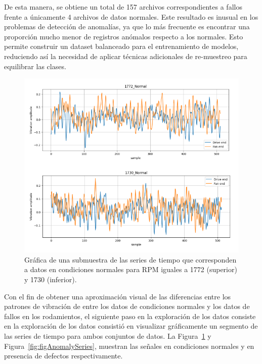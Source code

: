 \documentclass[11pt,a4paper,spanish]{book}
\numberwithin{equation}{chapter}
\numberwithin{figure}{chapter}
\begin{document}
De esta manera, se obtiene un total de 157 archivos correspondientes a fallos frente a únicamente 4 archivos de datos normales. Este resultado es inusual en los problemas de detección de anomalías, ya que lo más frecuente es encontrar una proporción mucho menor de registros anómalos respecto a los normales. Esto permite construir un dataset balanceado para el entrenamiento de modelos, reduciendo así la necesidad de aplicar técnicas adicionales de re-muestreo para equilibrar las clases.


\begin{figure}[h]
    \centering
    \includegraphics[width=1\textwidth]{media/dataset/normal-series.png}
    \caption{Gráfica de una submuestra de las series de tiempo que corresponden a datos en condiciones normales para RPM iguales a 1772 (superior) y 1730 (inferior). }
    \label{fig:figNormalSeries}
\end{figure}


Con el fin de obtener una aproximación visual de las diferencias entre los patrones de vibración de entre los datos de condiciones normales y los datos de fallos en los rodamientos, el siguiente paso en la exploración de los datos consiste en la exploración de los datos consistió en visualizar gráficamente un segmento de las series de tiempo para ambos conjuntos de datos. La Figura~\ref{fig:figNormalSeries} y Figura~\ref{fig:figAnomalySeries}, muestran las señales en condiciones normales y en presencia de defectos respectivamente. 
\end{document}
